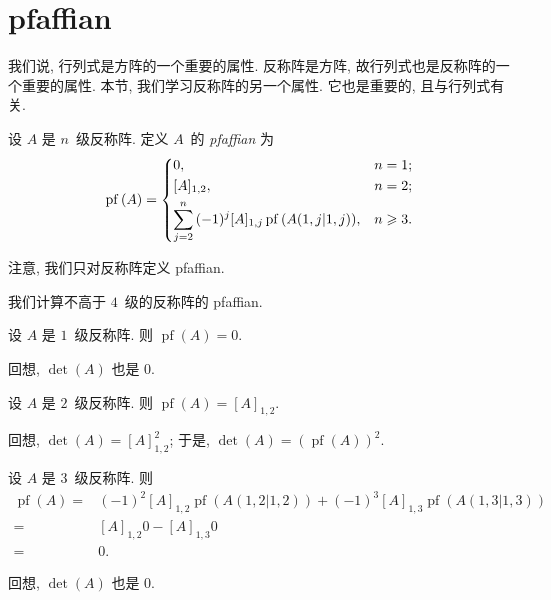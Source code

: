 \documentclass[../libro.tex]{subfiles}
\begin{document}
\section{pfaffian}

我们说, 行列式是方阵的一个重要的属性.
反称阵是方阵, 故行列式也是反称阵的一个重要的属性.
本节, 我们学习反称阵的另一个属性.
它也是重要的, 且与行列式有关.

\begin{definition}
    设 \(A\) 是 \(n\)~级反称阵.
    定义 \(A\)~的 \emph{pfaffian} 为
    \begin{align*}
        \operatorname{pf} {(A)} =
        \begin{dcases}
            0,
            & n = 1;    \\
            [A]_{1,2},
            & n = 2;    \\
            \sum_{j = 2}^{n}
            {(-1)^{j} [A]_{1,j}
            \operatorname{pf} {(A({1,j}|{1,j}))}},
            & n \geq 3.
        \end{dcases}
    \end{align*}
\end{definition}


注意, 我们只对反称阵定义 pfaffian.

我们计算不高于 \(4\)~级的反称阵的 pfaffian.

\begin{example}
    设 \(A\) 是 \(1\)~级反称阵.
    则 \(\operatorname{pf} {(A)} = 0\).

    回想, \(\det {(A)}\) 也是 \(0\).
\end{example}

\begin{example}
    设 \(A\) 是 \(2\)~级反称阵.
    则 \(\operatorname{pf} {(A)} = [A]_{1,2}\).

    回想, \(\det {(A)} = [A]_{1,2}^2\);
    于是, \(\det {(A)} = (\operatorname{pf} {(A)})^2\).
\end{example}

\begin{example}
    设 \(A\) 是 \(3\)~级反称阵.
    则
    \begin{align*}
        \operatorname{pf} {(A)}
        = {} &
        (-1)^2 [A]_{1,2} \operatorname{pf} {(A({1,2}|{1,2}))}
        +
        (-1)^3 [A]_{1,3} \operatorname{pf} {(A({1,3}|{1,3}))}
        \\
        = {} &
        [A]_{1,2} 0 - [A]_{1,3} 0
        \\
        = {} &
        0.
    \end{align*}

    回想, \(\det {(A)}\) 也是 \(0\).
\end{example}
\end{document}
